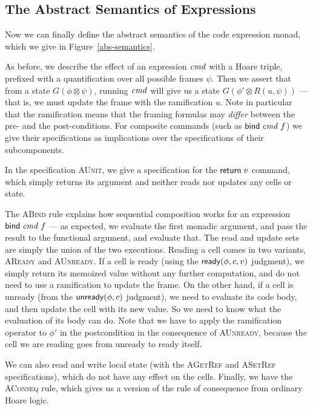 \subsection{The Abstract Semantics of Expressions}

Now we can finally define the abstract semantics of the code
expression monad, which we give in Figure~\ref{abs-semantics}.

As before, we describe the effect of an expression $\mathit{cmd}$ with a Hoare
triple, prefixed with a quantification over all possible frames
$\psi$. Then we assert that from a state $G(\phi \otimes \psi)$,
running $\mathit{cmd}$ will give us a state $G(\phi' \otimes R(u, \psi))$ ---
that is, we must update the frame with the ramification $u$. Note in
particular that the ramification means that the framing formulas may
\emph{differ} between the pre- and the post-conditions. For composite
commands (such as $\mathsf{bind}\; \mathit{cmd}\;f$) we give their specifications as
implications over the specifications of their subcomponents.

In the specification \textsc{AUnit}, we give a specification for the
$\mathsf{return}\; v$ command, which simply returns its argument and neither
reads nor updates any cells or state. 

The \textsc{ABind} rule explains how sequential composition works for
an expression $\mathsf{bind}\; \mathit{cmd}\;f$ --- as expected, we evaluate the first
monadic argument, and pass the result to the functional argument, and
evaluate that. The read and update sets are simply the union of the
two executions. Reading a cell comes in two variants, \textsc{AReady}
and \textsc{AUnready}. If a cell is ready (using the
$\mathsf{ready}({\phi}, {c}, {v})$ judgment), we simply return its memoized value
without any further computation, and do not need to use a ramification
to update the frame. On the other hand, if a cell is unready (from the
$\mathsf{unready}({\phi}, {c})$ judgment), we need to evaluate its code body, and
then update the cell with its new value. So we need to know what the
evaluation of its body can do. Note that we have to apply the
ramification operator to $\phi'$ in the postcondition in the
consequence of \textsc{AUnready}, because the cell we are reading goes
from unready to ready itself. 

We can also read and write local state (with the \textsc{AGetRef} and
\textsc{ASetRef} specifications), which do not have any effect on the
cells. Finally, we have the \textsc{AConseq} rule, which gives us a
version of the rule of consequence from ordinary Hoare logic.

